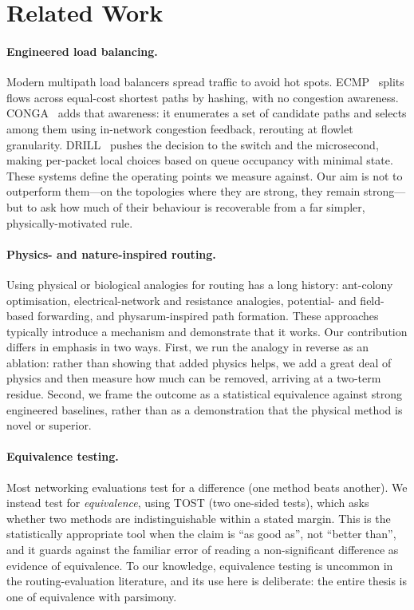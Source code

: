 \section{Related Work}
\label{sec:related}

\paragraph{Engineered load balancing.}
Modern multipath load balancers spread traffic to avoid hot spots.
ECMP~\cite{ecmp} splits flows across equal-cost shortest paths by hashing, with
no congestion awareness. CONGA~\cite{conga} adds that awareness: it enumerates a
set of candidate paths and selects among them using in-network congestion
feedback, rerouting at flowlet granularity. DRILL~\cite{drill} pushes the
decision to the switch and the microsecond, making per-packet local choices
based on queue occupancy with minimal state. These systems define the operating
points we measure against. Our aim is not to outperform them---on the
topologies where they are strong, they remain strong---but to ask how much of
their behaviour is recoverable from a far simpler, physically-motivated rule.

\paragraph{Physics- and nature-inspired routing.}
Using physical or biological analogies for routing has a long history:
ant-colony optimisation, electrical-network and resistance analogies,
potential- and field-based forwarding, and physarum-inspired path formation.
These approaches typically introduce a mechanism and demonstrate that it works.
Our contribution differs in emphasis in two ways. First, we run the analogy in
reverse as an ablation: rather than showing that added physics helps, we add a
great deal of physics and then measure how much can be removed, arriving at a
two-term residue. Second, we frame the outcome as a statistical equivalence
against strong engineered baselines, rather than as a demonstration that the
physical method is novel or superior.

\paragraph{Equivalence testing.}
Most networking evaluations test for a difference (one method beats another).
We instead test for \emph{equivalence}, using TOST (two one-sided
tests), which asks whether two methods are indistinguishable within a stated
margin. This is the statistically appropriate tool when the claim is ``as good
as'', not ``better than'', and it guards against the familiar error of reading a
non-significant difference as evidence of equivalence. To our knowledge,
equivalence testing is uncommon in the routing-evaluation literature, and its
use here is deliberate: the entire thesis is one of equivalence with parsimony.

